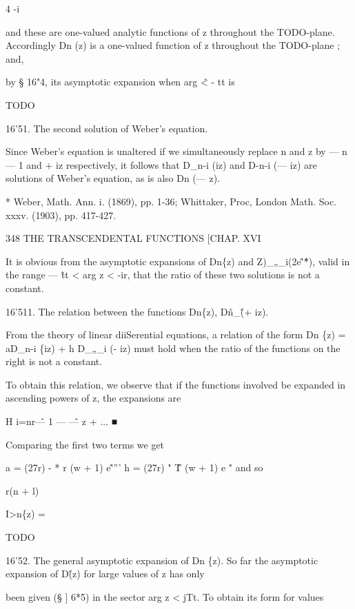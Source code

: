 4 
-i 






and these are one-valued analytic functions of z throughout the TODO-plane. 
Accordingly Dn (z) is a one-valued function of z throughout the TODO-plane ; and, 

by § 16"4, its asymptotic expansion when arg \^ < - tt is 

TODO

16'51. The second solution of Weber's equation. 

Since Weber's equation is unaltered if we simultaneously replace n 
and z by — n — 1 and + iz respectively, it follows that D\_n-i (iz) and 
D-n-i (— iz) are solutions of Weber's equation, as is also Dn (— z). 

* Weber, Math. Ann. i. (1869), pp. 1-36; Whittaker, Proc, London Math. Soc. xxxv. (1903), 
pp. 417-427. 



348 THE TRANSCENDENTAL FUNCTIONS [CHAP. XVI 

It is obvious from the asymptotic expansions of Dn\{z) and Z)\_„\_i(2e\^'\^*), 
valid in the range — \^ tt < arg z < -ir, that the ratio of these two solutions is 
not a constant. 

16'511. The relation between the functions Dn\{z), D\^n\_\^ (+ iz). 

From the theory of linear diiSerential equations, a relation of the form 
Dn \{z) = aD\_n-i \{iz) + h D\_„\_i (- iz) 
must hold when the ratio of the functions on the right is not a constant. 

To obtain this relation, we observe that if the functions involved be 
expanded in ascending powers of z, the expansions are 

H i=nr\^ — 1 — \^ — z + ... ■ 



Comparing the first two terms we get 

a = (27r) - * r (w + 1) e\^'''' h = (27r) " \^ T (w + 1) e " 
and so 

r(n + l) 



I>n\{z) = 



TODO

16'52. The general asymptotic expansion of Dn \{z). 
So far the asymptotic expansion of D\^ (z) for large values of z has only 

been given (§ ] 6*5) in the sector arg z < jTt. To obtain its form for values 

